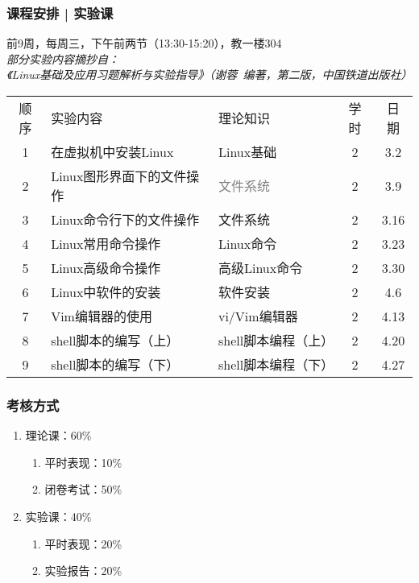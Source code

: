 \begin{frame}
  \frametitle{课程安排 | 实验课}
  \begin{center}
  \alert{前9周，每周三，下午前两节（13:30-15:20），教一楼304}\\
  \vspace{0.2cm}
  {\footnotesize
  \textit{部分实验内容摘抄自：\\ 《Linux基础及应用习题解析与实验指导》（谢蓉\ 编著，第二版，中国铁道出版社）}
  }
  \end{center}
  \vspace{-0.5cm}
  \begin{table}
    \centering
    \begin{tabular}{cllcc}
      \hline
      \rowcolor{blue!50}顺序 & 实验内容 & 理论知识 & 学时 & 日期\\
      1 & 在虚拟机中安装Linux & Linux基础 & 2 & 3.2\\
      2 & Linux图形界面下的文件操作 & \textcolor{gray}{文件系统} & 2 & 3.9\\
      3 & Linux命令行下的文件操作 & 文件系统 & 2 & 3.16\\
      4 & Linux常用命令操作 & Linux命令 & 2 & 3.23\\
      5 & Linux高级命令操作 & 高级Linux命令 & 2 & 3.30\\
      6 & Linux中软件的安装 & 软件安装 & 2 & 4.6\\
      7 & Vim编辑器的使用 & vi/Vim编辑器 & 2 & 4.13\\
      8 & shell脚本的编写（上） & shell脚本编程（上） & 2 & 4.20\\
      9 & shell脚本的编写（下） & shell脚本编程（下） & 2 & 4.27\\
      \hline
    \end{tabular}
  \end{table}
\end{frame}

\begin{frame}
  \frametitle{考核方式}
  \begin{enumerate}
    \item 理论课：60\%
      \begin{enumerate}
        \item 平时表现：10\%
        \item 闭卷考试：50\%
      \end{enumerate}
    \item 实验课：40\%
      \begin{enumerate}
        \item 平时表现：20\%
        \item 实验报告：20\%
      \end{enumerate}
  \end{enumerate}
\end{frame}

